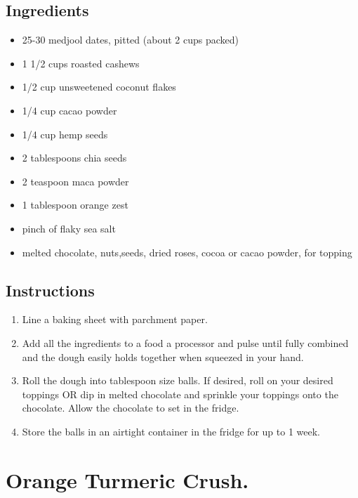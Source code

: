 \documentclass[
  letterpaper,
  DIV=11,
  numbers=noendperiod,
  titlepage=false]{scrreprt}
\providecommand{\tightlist}{%
  \setlength{\itemsep}{0pt}\setlength{\parskip}{0pt}}\usepackage{longtable,booktabs,array}
\begin{document}
\section{Ingredients}\label{ingredients-145}

\begin{itemize}
\tightlist
\item
  25-30 medjool dates, pitted (about 2 cups packed)
\item
  1 1/2 cups roasted cashews
\item
  1/2 cup unsweetened coconut flakes
\item
  1/4 cup cacao powder
\item
  1/4 cup hemp seeds
\item
  2 tablespoons chia seeds
\item
  2 teaspoon maca powder
\item
  1 tablespoon orange zest
\item
  pinch of flaky sea salt
\item
  melted chocolate, nuts,seeds, dried roses, cocoa or cacao powder, for
  topping
\end{itemize}

\section{Instructions}\label{instructions-145}

\begin{enumerate}
\def\labelenumi{\arabic{enumi}.}
\tightlist
\item
  Line a baking sheet with parchment paper.
\item
  Add all the ingredients to a food a processor and pulse until fully
  combined and the dough easily holds together when squeezed in your
  hand.
\item
  Roll the dough into tablespoon size balls. If desired, roll on your
  desired toppings OR dip in melted chocolate and sprinkle your toppings
  onto the chocolate. Allow the chocolate to set in the fridge.
\item
  Store the balls in an airtight container in the fridge for up to 1
  week.
\end{enumerate}


\chapter{Orange Turmeric Crush.}\label{orange-turmeric-crush.}
\end{document}
